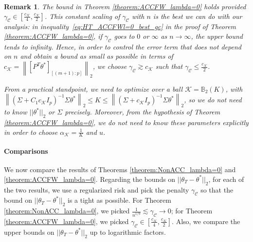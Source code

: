 \documentclass{article}
\newtheorem{remark}{\textbf{Remark}}
\begin{document}
\begin{remark}
The bound in Theorem \ref{theorem:ACCFW_lambda=0} holds provided $\gamma_{\mathcal{C}} \in \left[\frac{c_{\mathcal{K}}}{4}, \frac{c_{\mathcal{K}}}{2}\right]$. This constant scaling of $\gamma_{\mathcal{C}}$ with $n$ is the best we can do with our analysis: in inequality~\eqref{eq:HT_ACCFWl=0_best_gc} in the proof of Theorem \ref{theorem:ACCFW_lambda=0}, if $\gamma_{\mathcal{C}}$ goes to $0$ or $\infty$ as $n \rightarrow \infty$, the upper bound tends to infinity. Hence, in order to control the error term that does not depend on $n$ and obtain a bound as small as possible in terms of $c_{\mathcal{K}} = \left\|[P^T\theta^*]_{[(m+1):p]}\right\|_2$, we choose $\gamma_{\mathcal{C}} \gtrsim c_{\mathcal{K}}$ such that $\gamma_{\mathcal{C}} \leq \frac{c_{\mathcal{K}}}{2}$.

From a practical standpoint, we need to optimize over a ball $\mathcal{K} = \mathbb{B}_2(K)$, with $\left\|\left(\Sigma + C_1c_{\mathcal{K}}I_p\right)^{-1}\Sigma\theta^*\right\|_2 \leq K \leq \left\|\left(\Sigma + c_{\mathcal{K}}I_p\right)^{-1}\Sigma\theta^*\right\|_2$, so we do not need to know $||\theta^*||_2$ or $\Sigma$ precisely. Moreover, from the hypothesis of Theorem \ref{theorem:ACCFW_lambda=0}, we do not need to know these parameters explicitly in order to choose $\alpha_{\mathcal{K}} = \frac{1}{K}$ and $u$.

\end{remark}

\paragraph{Comparisons}

We now compare the results of Theorems \ref{theorem:NonACC_lambda=0} and \ref{theorem:ACCFW_lambda=0}. Regarding the bounds on $||\theta_T - \theta^*||_2$, for each of the two results, we use a regularized risk and pick the penalty $\gamma_{\mathcal{C}}$ so that the bound on $||\theta_T - \theta^*||_2$ is a tight as possible. For Theorem \ref{theorem:NonACC_lambda=0}, we picked $\frac{1}{n^{1/9}} \lesssim \gamma_{\mathcal{C}} \rightarrow 0$; for Theorem \ref{theorem:ACCFW_lambda=0}, we picked $\gamma_{\mathcal{C}} \in \left[\frac{c_{\mathcal{K}}}{4}, \frac{c_{\mathcal{K}}}{2}\right]$. Also, we compare the upper bounds on $||\theta_T - \theta^*||_2$ up to logarithmic factors.
\end{document}
